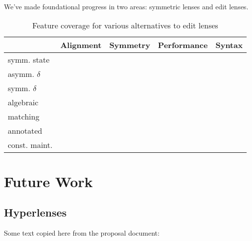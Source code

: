 We've made foundational progress in two areas: symmetric lenses and edit
lenses.
\begin{table}
    \begin{center}
        \begin{tabularx}{\linewidth}{m{4.4em}|XXXX}
        & Alignment & Symmetry & Performance & Syntax \\
        \hline
        symm. state     &
                        &
                        &\N
                        &
        \\
        asymm. $\delta$ &\Y
                        &\N
                        &\N
                        &\Y
        \\
        symm. $\delta$  &\Y
                        &\Y
                        &\N
                        &\N
        \\
        algebraic       &\Y
                        &\N
                        &
                        &
        \\
        matching        &
                        &\N
                        &\N
                        &\Y
        \\
        annotated       &
                        &\N
                        &\N
                        &\Y
        \\
        const. maint.   &\Y
                        &\Y
                        &\N
                        &
    \end{tabularx}
    \end{center}
    \caption{Feature coverage for various alternatives to edit lenses}
    \label{tab:related-commentary}
\end{table}

\section{Future Work}
\label{sec:future}

\subsection{Hyperlenses}
\label{sec:future-hyperlenses}
Some text copied here from the proposal document:

